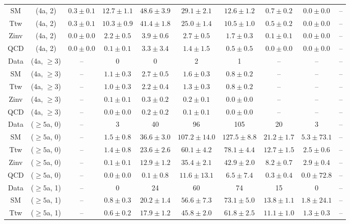 \begin{table}[h!]
{\begin{tabular}{cccccccccc}
	SM & (4a, 2) & $0.3\pm 0.1$ & $12.7\pm 1.1$ & $48.6\pm 3.9$ & $29.1\pm 2.1$ & $12.6\pm 1.2$ & $0.7\pm 0.2$ & $0.0\pm 0.0$ & -- \\[0.5ex] 
	Ttw & (4a, 2) & $0.3\pm 0.1$ & $10.3\pm 0.9$ & $41.4\pm 1.8$ & $25.0\pm 1.4$ & $10.5\pm 1.0$ & $0.5\pm 0.2$ & $0.0\pm 0.0$ & -- \\[0.5ex] 
	Zinv & (4a, 2) & $0.0\pm 0.0$ & $2.2\pm 0.5$ & $3.9\pm 0.6$ & $2.7\pm 0.5$ & $1.7\pm 0.3$ & $0.1\pm 0.1$ & $0.0\pm 0.0$ & -- \\[0.5ex] 
	QCD & (4a, 2) & $0.0\pm 0.0$ & $0.1\pm 0.1$ & $3.3\pm 3.4$ & $1.4\pm 1.5$ & $0.5\pm 0.5$ & $0.0\pm 0.0$ & $0.0\pm 0.0$ & -- \\[0.5ex] 
	Data & (4a, $\ge3$) & -- & 0 & 0 & 2 & 1 & -- & -- & -- \\[0.5ex] 
	SM & (4a, $\ge3$) & -- & $1.1\pm 0.3$ & $2.7\pm 0.5$ & $1.6\pm 0.3$ & $0.8\pm 0.2$ & -- & -- & -- \\[0.5ex] 
	Ttw & (4a, $\ge3$) & -- & $1.0\pm 0.3$ & $2.2\pm 0.4$ & $1.3\pm 0.3$ & $0.8\pm 0.2$ & -- & -- & -- \\[0.5ex] 
	Zinv & (4a, $\ge3$) & -- & $0.1\pm 0.1$ & $0.3\pm 0.2$ & $0.2\pm 0.1$ & $0.0\pm 0.0$ & -- & -- & -- \\[0.5ex] 
	QCD & (4a, $\ge3$) & -- & $0.0\pm 0.0$ & $0.2\pm 0.2$ & $0.1\pm 0.1$ & $0.0\pm 0.0$ & -- & -- & -- \\[0.5ex] 
	Data & ($\ge5$a, 0) & -- & 3 & 40 & 96 & 105 & 20 & 3 & -- \\[0.5ex] 
	SM & ($\ge5$a, 0) & -- & $1.5\pm 0.8$ & $36.6\pm 3.0$ & $107.2\pm 14.0$ & $127.5\pm 8.8$ & $21.2\pm 1.7$ & $5.3\pm 73.1$ & -- \\[0.5ex] 
	Ttw & ($\ge5$a, 0) & -- & $1.4\pm 0.8$ & $23.6\pm 2.6$ & $60.1\pm 4.2$ & $78.1\pm 4.4$ & $12.7\pm 1.5$ & $2.5\pm 0.6$ & -- \\[0.5ex] 
	Zinv & ($\ge5$a, 0) & -- & $0.1\pm 0.1$ & $12.9\pm 1.2$ & $35.4\pm 2.1$ & $42.9\pm 2.0$ & $8.2\pm 0.7$ & $2.9\pm 0.4$ & -- \\[0.5ex] 
	QCD & ($\ge5$a, 0) & -- & $0.0\pm 0.0$ & $0.1\pm 0.8$ & $11.6\pm 13.1$ & $6.5\pm 7.4$ & $0.3\pm 0.4$ & $0.0\pm 72.8$ & -- \\[0.5ex] 
	Data & ($\ge5$a, 1) & -- & 0 & 24 & 60 & 74 & 15 & 0 & -- \\[0.5ex] 
	SM & ($\ge5$a, 1) & -- & $0.8\pm 0.3$ & $20.2\pm 1.4$ & $56.6\pm 7.3$ & $73.1\pm 5.0$ & $13.8\pm 1.1$ & $1.8\pm 24.1$ & -- \\[0.5ex] 
	Ttw & ($\ge5$a, 1) & -- & $0.6\pm 0.2$ & $17.9\pm 1.2$ & $45.8\pm 2.0$ & $61.8\pm 2.5$ & $11.1\pm 1.0$ & $1.3\pm 0.3$ & -- \\[0.5ex] 

\end{tabular}}
\end{table}
